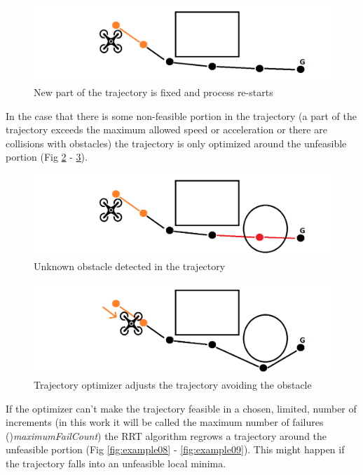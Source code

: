 \begin{figure}[ht!]
   \centering
   \includegraphics[width=0.6\linewidth]{Figures/03_proposed/EXAMPLE_04.png}
   \caption{New part of the trajectory is fixed and process re-starts}
   \label{fig:example04}
\end{figure}

In the case that there is some non-feasible portion in the trajectory (a part of the trajectory exceeds the maximum allowed speed or acceleration or there are collisions with obstacles) the trajectory is only optimized around the unfeasible portion (Fig \ref{fig:example05} - \ref{fig:example06}).

\begin{figure}[ht!]
   \centering
   \includegraphics[width=0.6\linewidth]{Figures/03_proposed/EXAMPLE_05.png}
   \caption{Unknown obstacle detected in the trajectory}
   \label{fig:example05}
\end{figure}

\begin{figure}[ht!]
   \centering
   \includegraphics[width=0.6\linewidth]{Figures/03_proposed/EXAMPLE_06.png}
   \caption{Trajectory optimizer adjusts the trajectory avoiding the obstacle}
   \label{fig:example06}
\end{figure}


\par
If the optimizer can't make the trajectory feasible in a chosen, limited, number of increments (in this work it will be called the maximum number of failures ()\textit{maximumFailCount}) the RRT algorithm regrows a trajectory around the unfeasible portion (Fig \ref{fig:example08} - \ref{fig:example09}). This might happen if the trajectory falls into an unfeasible local minima.



